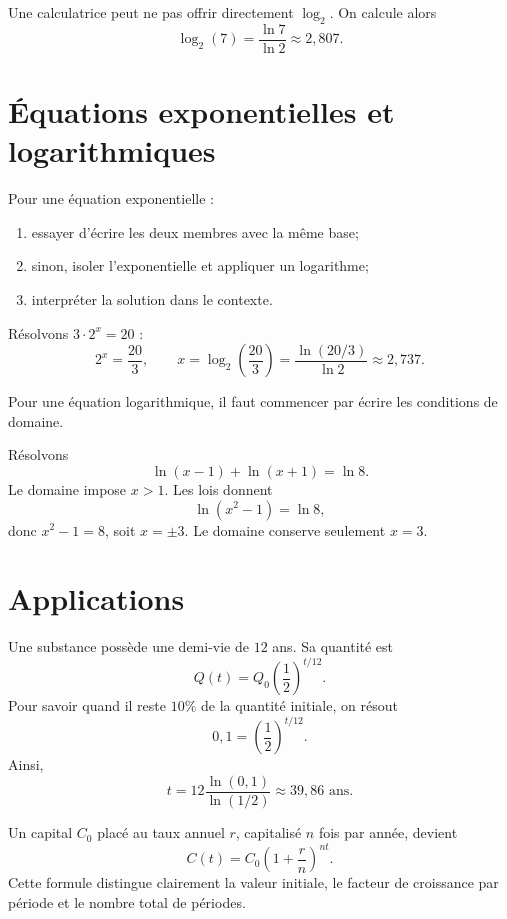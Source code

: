\documentclass[12pt,a4paper,openany]{book}
\begin{document}
\begin{examplebox}
Une calculatrice peut ne pas offrir directement $\log_2$. On calcule alors
\[
\log_2(7)=\frac{\ln7}{\ln2}\approx2{,}807.
\]
\end{examplebox}

\section{Équations exponentielles et logarithmiques}

\begin{methodbox}
Pour une équation exponentielle :
\begin{enumerate}
\item essayer d'écrire les deux membres avec la même base;
\item sinon, isoler l'exponentielle et appliquer un logarithme;
\item interpréter la solution dans le contexte.
\end{enumerate}
\end{methodbox}

\begin{examplebox}
Résolvons $3\cdot2^x=20$ :
\[
2^x=\frac{20}{3},
\qquad
x=\log_2\left(\frac{20}{3}\right)=\frac{\ln(20/3)}{\ln2}\approx2{,}737.
\]
\end{examplebox}

Pour une équation logarithmique, il faut commencer par écrire les conditions de domaine.

\begin{examplebox}
Résolvons
\[
\ln(x-1)+\ln(x+1)=\ln8.
\]
Le domaine impose $x>1$. Les lois donnent
\[
\ln(x^2-1)=\ln8,
\]
donc $x^2-1=8$, soit $x=\pm3$. Le domaine conserve seulement $x=3$.
\end{examplebox}

\section{Applications}

\begin{examplebox}[title={Exemple : demi-vie}]
Une substance possède une demi-vie de $12$ ans. Sa quantité est
\[
Q(t)=Q_0\left(\frac12\right)^{t/12}.
\]
Pour savoir quand il reste $10\%$ de la quantité initiale, on résout
\[
0{,}1=\left(\frac12\right)^{t/12}.
\]
Ainsi,
\[
t=12\frac{\ln(0{,}1)}{\ln(1/2)}\approx39{,}86\text{ ans}.
\]
\end{examplebox}

\begin{examplebox}[title={Exemple : intérêts composés}]
Un capital $C_0$ placé au taux annuel $r$, capitalisé $n$ fois par année, devient
\[
C(t)=C_0\left(1+\frac rn\right)^{nt}.
\]
Cette formule distingue clairement la valeur initiale, le facteur de croissance par période et le nombre total de périodes.
\end{examplebox}
\end{document}

